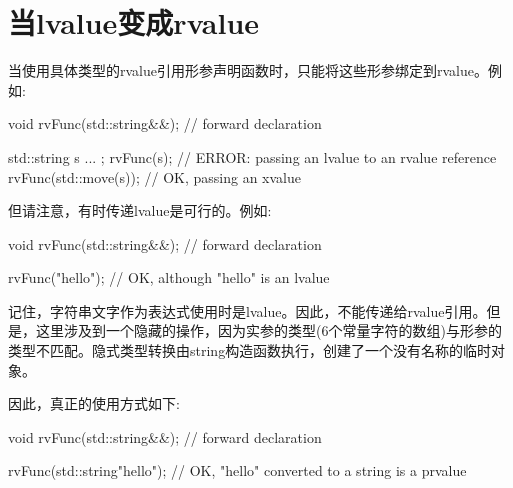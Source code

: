 \section{当lvalue变成rvalue}
当使用具体类型的rvalue引用形参声明函数时，只能将这些形参绑定到rvalue。例如:

\begin{cppcode}
void rvFunc(std::string&&); // forward declaration

std::string s{ ... };
rvFunc(s); // ERROR: passing an lvalue to an rvalue reference
rvFunc(std::move(s)); // OK, passing an xvalue
\end{cppcode}

但请注意，有时传递lvalue是可行的。例如:

\begin{cppcode}
void rvFunc(std::string&&); // forward declaration

rvFunc("hello"); // OK, although "hello" is an lvalue
\end{cppcode}

记住，字符串文字作为表达式使用时是lvalue。因此，不能传递给rvalue引用。但是，这里涉及到一个隐藏的操作，因为实参的类型(6个常量字符的数组)与形参的类型不匹配。隐式类型转换由string构造函数执行，创建了一个没有名称的临时对象。

因此，真正的使用方式如下:

\begin{cppcode}
void rvFunc(std::string&&); // forward declaration

rvFunc(std::string{"hello"}); // OK, "hello" converted to a string is a prvalue
\end{cppcode}






























































